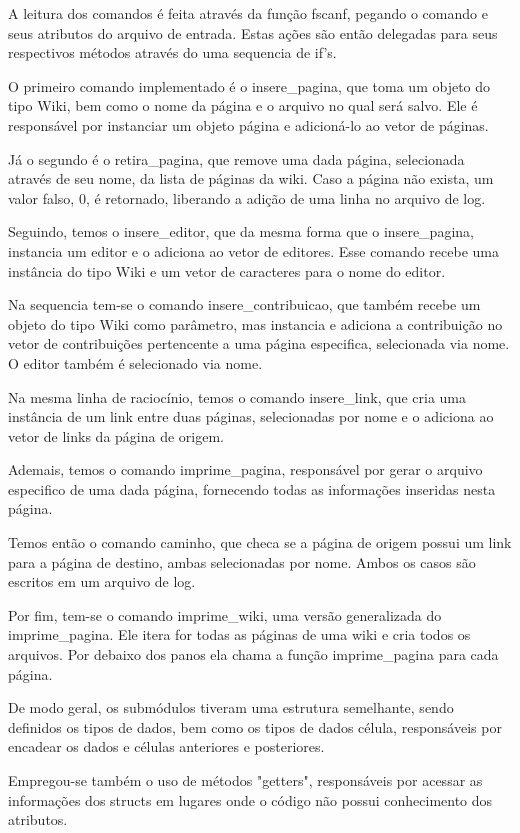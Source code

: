 \documentclass[
	12pt,
	oneside,
	a4paper,
	english,
	french,
	spanish,
	brazil,
	]{abntex2}
\begin{document}
A leitura dos comandos é feita através da função fscanf, pegando o comando e
seus atributos do arquivo de entrada. Estas ações são então delegadas para seus
respectivos métodos através do uma sequencia de if's.

O primeiro comando implementado é o insere\_pagina, que toma um objeto do tipo
Wiki, bem como o nome da página e o arquivo no qual será salvo. Ele é
responsável por instanciar um objeto página e adicioná-lo ao vetor de páginas.

Já o segundo é o retira\_pagina, que remove uma dada página, selecionada através
de seu nome, da lista de páginas da wiki. Caso a página não exista, um valor
falso, 0, é retornado, liberando a adição de uma linha no arquivo de log.

Seguindo, temos o insere\_editor, que da mesma forma que o insere\_pagina,
instancia um editor e o adiciona ao vetor de editores. Esse comando recebe uma
instância do tipo Wiki e um vetor de caracteres para o nome do editor.

Na sequencia tem-se o comando insere\_contribuicao, que também recebe um objeto
do tipo Wiki como parâmetro, mas instancia e adiciona a contribuição no vetor
de contribuições pertencente a uma página especifica, selecionada via nome. O
editor também é selecionado via nome.

Na mesma linha de raciocínio, temos o comando insere\_link, que cria uma
instância de um link entre duas páginas, selecionadas por nome e  o adiciona ao
vetor de links da página de origem.

Ademais, temos o comando imprime\_pagina, responsável por gerar o arquivo
especifico de uma dada página, fornecendo todas as informações inseridas nesta
página.

Temos então o comando caminho, que checa se a página de origem possui um link
para a página de destino, ambas selecionadas por nome. Ambos os casos são
escritos em um arquivo de log.

Por fim, tem-se o comando imprime\_wiki, uma versão generalizada do
imprime\_pagina. Ele itera for todas as páginas de uma wiki e cria todos os
arquivos. Por debaixo dos panos ela chama a função imprime\_pagina para cada
página.

De modo geral, os submódulos tiveram uma estrutura semelhante, sendo definidos
os tipos de dados, bem como os tipos de dados célula, responsáveis por encadear
os dados e células anteriores e posteriores.

Empregou-se também o uso de métodos "getters", responsáveis por acessar as
informações dos structs em lugares onde o código não possui conhecimento dos
atributos.
\end{document}
